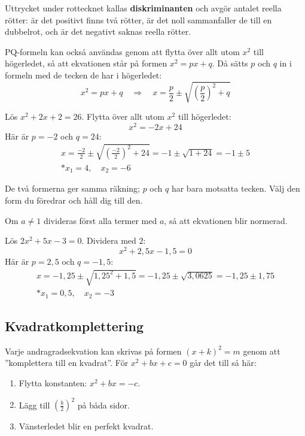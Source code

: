 Uttrycket under rottecknet kallas \textbf{diskriminanten} och avgör antalet reella rötter: är det
positivt finns två rötter, är det noll sammanfaller de till en dubbelrot, och är det negativt
saknas reella rötter.

PQ-formeln kan också användas genom att flytta över allt utom $x^2$ till högerledet, så att
ekvationen står på formen $x^2 = px + q$. Då sätts $p$ och $q$ in i formeln med de tecken de har i
högerledet:
\[
  x^2 = px + q \quad \Rightarrow \quad x = \frac{p}{2} \pm \sqrt{\left(\frac{p}{2}\right)^2 + q}
\]

\begin{exempel}
Lös $x^2 + 2x + 2 = 26$. Flytta över allt utom $x^2$ till högerledet:
\[
  x^2 = -2x + 24
\]
Här är $p = -2$ och $q = 24$:
\begin{gather*}
  x = \frac{-2}{2} \pm \sqrt{\left(\frac{-2}{2}\right)^2 + 24} = -1 \pm \sqrt{1 + 24} = -1 \pm 5 \\*
  x_1 = 4, \quad x_2 = -6
\end{gather*}
\end{exempel}

De två formerna ger samma räkning; $p$ och $q$ har bara motsatta tecken. Välj den form du föredrar
och håll dig till den.

Om $a \neq 1$ divideras först alla termer med $a$, så att ekvationen blir normerad.

\begin{exempel}
Lös $2x^2 + 5x - 3 = 0$. Dividera med $2$:
\[
  x^2 + 2{,}5x - 1{,}5 = 0
\]
Här är $p = 2{,}5$ och $q = -1{,}5$:
\begin{gather*}
  x = -1{,}25 \pm \sqrt{1{,}25^2 + 1{,}5} = -1{,}25 \pm \sqrt{3{,}0625} = -1{,}25 \pm 1{,}75 \\*
  x_1 = 0{,}5, \quad x_2 = -3
\end{gather*}
\end{exempel}

\subsection{Kvadratkomplettering}
\label{c6:sec:kvadratkomplettering}
Varje andragradsekvation kan skrivas på formen $(x + k)^2 = m$ genom att ”komplettera till en
kvadrat”. För $x^2 + bx + c = 0$ går det till så här:
\begin{enumerate}
  \item Flytta konstanten: $x^2 + bx = -c$.
  \item Lägg till $\left(\frac{b}{2}\right)^2$ på båda sidor.
  \item Vänsterledet blir en perfekt kvadrat.
\end{enumerate}

